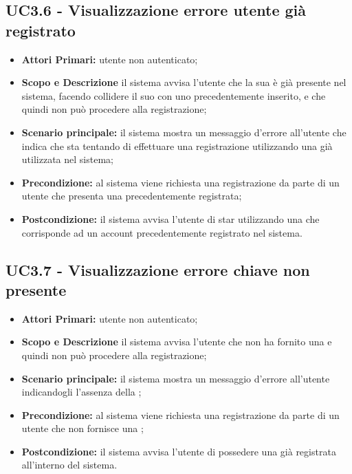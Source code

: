 \documentclass[AnalisiDeiRequisiti.tex]{subfiles}
\begin{document}
\subsection{UC3.6 - Visualizzazione errore utente già registrato}
\begin{itemize}
	\item \textbf{Attori Primari:} utente non autenticato;
	\item \textbf{Scopo e Descrizione} il sistema avvisa l'utente che la sua  è già presente nel sistema, facendo collidere il suo  con uno precedentemente inserito, e che quindi non può procedere alla registrazione;
	\item \textbf{Scenario principale:} il sistema mostra un messaggio d'errore all'utente che indica che sta tentando di effettuare una registrazione utilizzando una  già utilizzata nel sistema;
	\item \textbf{Precondizione:} al sistema viene richiesta una registrazione da parte di un utente che presenta una  precedentemente registrata;
	\item \textbf{Postcondizione:} il sistema avvisa l'utente di star utilizzando una  che corrisponde ad un account precedentemente registrato nel sistema.
\end{itemize}
\subsection{UC3.7 - Visualizzazione errore chiave non presente}
\begin{itemize}
	\item \textbf{Attori Primari:} utente non autenticato;
	\item \textbf{Scopo e Descrizione} il sistema avvisa l'utente che non ha fornito una  e quindi non può procedere alla registrazione;
	\item \textbf{Scenario principale:} il sistema mostra un messaggio d'errore all'utente indicandogli l'assenza della ;
	\item \textbf{Precondizione:} al sistema viene richiesta una registrazione da parte di un utente che non fornisce una ;
	\item \textbf{Postcondizione:} il sistema avvisa l'utente di possedere una  già registrata all'interno del sistema.
\end{itemize}
\end{document}
